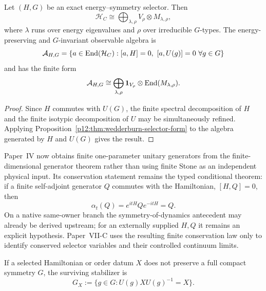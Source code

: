 \documentclass[12pt,a4paper]{article}
\begin{document}
\begin{theorem}
\label{p12:thm:finite-energy-symmetry-sector}
Let \((H,G)\) be an exact energy--symmetry selector.  Then
\[
\mathcal H_C
\cong
\bigoplus_{\lambda,\rho}
V_\rho\otimes M_{\lambda,\rho},
\]
where \(\lambda\) runs over energy eigenvalues and \(\rho\) over irreducible \(G\)-types.  The energy-preserving and \(G\)-invariant observable algebra is
\begin{equation}
\label{p12:eq:energy-symmetry-observable-algebra}
\mathcal A_{H,G}
=
\{a\in\operatorname{End}(\mathcal H_C):[a,H]=0,\ [a,U(g)]=0\ \forall g\in G\}
\end{equation}
and has the finite form
\begin{equation}
\label{p12:eq:energy-symmetry-wedderburn}
\mathcal A_{H,G}
\cong
\bigoplus_{\lambda,\rho}
\mathbf1_{V_\rho}\otimes\operatorname{End}(M_{\lambda,\rho}).
\end{equation}
\end{theorem}

\begin{proof}
Since \(H\) commutes with \(U(G)\), the finite spectral decomposition of \(H\) and the finite isotypic decomposition of \(U\) may be simultaneously refined.  Applying Proposition~\ref{p12:thm:wedderburn-selector-form} to the algebra generated by \(H\) and \(U(G)\) gives the result.
\end{proof}

\begin{remark}
\label{p12:cor:finite-noether}
Paper~IV now obtains finite one-parameter unitary generators from the
finite-dimensional generator theorem rather than using finite Stone as an
independent physical input.  Its conservation statement remains the typed
conditional theorem: if a finite self-adjoint generator \(Q\) commutes with
the Hamiltonian, \([H,Q]=0\), then
\[
\alpha_t(Q)=e^{itH}Qe^{-itH}=Q.
\]
On a native same-owner branch the symmetry-of-dynamics antecedent may already
be derived upstream; for an externally supplied \(H,Q\) it remains an explicit
hypothesis.  Paper~VII-C uses the resulting finite conservation law only to
identify conserved selector variables and their controlled continuum limits.
\end{remark}

\begin{definition}
\label{p12:def:stabilizer-after-breaking}
If a selected Hamiltonian or order datum \(X\) does not preserve a full compact symmetry \(G\), the surviving stabilizer is
\begin{equation}
\label{p12:eq:surviving-stabilizer}
G_X
:=
\{g\in G:U(g)XU(g)^{-1}=X\}.
\end{equation}
\end{definition}
\end{document}
